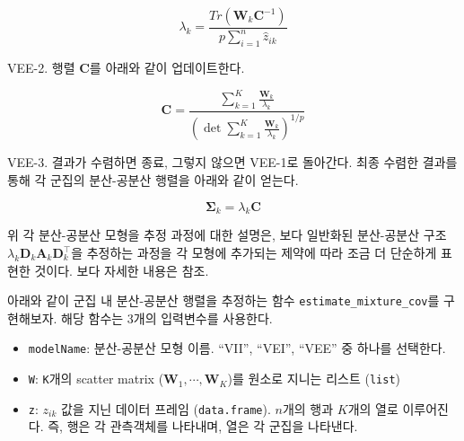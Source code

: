 \documentclass[
]{book}
\providecommand{\tightlist}{%
  \setlength{\itemsep}{0pt}\setlength{\parskip}{0pt}}
\begin{document}
\begin{equation*}
\lambda_k = \frac{Tr(\mathbf{W}_k \mathbf{C}^{-1})}{p \sum_{i = 1}^{n} \hat{z}_{ik}}
\end{equation*}

VEE-2. 행렬 \(\mathbf{C}\)를 아래와 같이 업데이트한다.

\begin{equation*}
\mathbf{C} = \frac{\sum_{k = 1}^{K} \frac{\mathbf{W}_k}{\lambda_k}}{\left( \det \sum_{k = 1}^{K} \frac{\mathbf{W}_k}{\lambda_k} \right)^{1 / p}}
\end{equation*}

VEE-3. 결과가 수렴하면 종료, 그렇지 않으면 VEE-1로 돌아간다. 최종 수렴한 결과를 통해 각 군집의 분산-공분산 행렬을 아래와 같이 얻는다.

\begin{equation*}
\boldsymbol\Sigma_k = \lambda_k \mathbf{C}
\end{equation*}

위 각 분산-공분산 모형을 추정 과정에 대한 설명은, 보다 일반화된 분산-공분산 구조 \(\lambda_k \mathbf{D}_k \mathbf{A}_k \mathbf{D}_k^\top\)을 추정하는 과정을 각 모형에 추가되는 제약에 따라 조금 더 단순하게 표현한 것이다. 보다 자세한 내용은 \citet{celeux1995gaussian} 참조.

아래와 같이 군집 내 분산-공분산 행렬을 추정하는 함수 \texttt{estimate\_mixture\_cov}를 구현해보자. 해당 함수는 3개의 입력변수를 사용한다.

\begin{itemize}
\tightlist
\item
  \texttt{modelName}: 분산-공분산 모형 이름. ``VII'', ``VEI'', ``VEE'' 중 하나를 선택한다.
\item
  \texttt{W}: \texttt{K}개의 scatter matrix (\(\mathbf{W}_1, \cdots, \mathbf{W}_K\))를 원소로 지니는 리스트 (\texttt{list})
\item
  \texttt{z}: \(z_{ik}\) 값을 지닌 데이터 프레임 (\texttt{data.frame}). \(n\)개의 행과 \(K\)개의 열로 이루어진다. 즉, 행은 각 관측객체를 나타내며, 열은 각 군집을 나타낸다.
\end{itemize}
\end{document}
